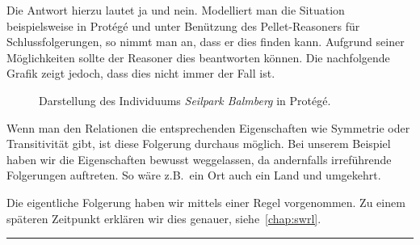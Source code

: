 Die Antwort hierzu lautet ja und nein. Modelliert man die Situation beispielsweise in Protégé und unter Benützung des Pellet-Reasoners für Schlussfolgerungen, so nimmt man an, dass er dies finden kann. Aufgrund seiner Möglichkeiten sollte der Reasoner dies beantworten können. Die nachfolgende Grafik zeigt jedoch, dass dies nicht immer der Fall ist.

\begin{figure}[H]
\centering {}
\caption{Darstellung des Individuums \textit{Seilpark Balmberg} in Protégé.\label{fig:inferenz_protege}\protect\footnotemark}
\end{figure}

Wenn man den Relationen die entsprechenden Eigenschaften wie Symmetrie oder Transitivität gibt, ist diese Folgerung durchaus möglich. Bei unserem Beispiel haben wir die Eigenschaften bewusst weggelassen, da andernfalls irreführende Folgerungen auftreten. So wäre z.B.\ ein Ort auch ein Land und umgekehrt.

Die eigentliche Folgerung haben wir mittels einer Regel vorgenommen. Zu einem späteren Zeitpunkt erklären wir dies genauer, siehe~\autoref{chap:swrl}.

\noindent\rule[1ex]{\textwidth}{1pt}
